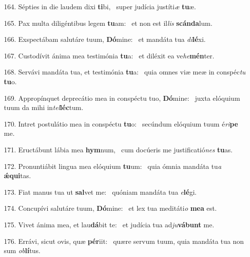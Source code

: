 164. Sépties in die laudem dixi \textbf{ti}bi, \ast\  super judícia justíti\textit{æ} \textbf{tu}æ.\

165. Pax multa diligéntibus legem \textbf{tu}am: \ast\  et non est il\textit{lis} \textbf{scán}\textbf{da}lum.\

166. Exspectábam salutáre tuum, \textbf{Dó}mine: \ast\  et mandáta tua \textit{di}\textbf{lé}xi.\

167. Custodívit ánima mea testimónia \textbf{tu}a: \ast\  et diléxit ea ve\textit{he}\textbf{mén}ter.\

168. Servávi mandáta tua, et testimónia \textbf{tu}a: \ast\  quia omnes viæ meæ in conspéc\textit{tu} \textbf{tu}o.\

169. Appropínquet deprecátio mea in conspéctu tuo, \textbf{Dó}mine: \ast\  juxta elóquium tuum da mihi in\textit{tel}\textbf{léc}tum.\

170. Intret postulátio mea in conspéctu \textbf{tu}o: \ast\  secúndum elóquium tuum é\textit{ri}\textbf{pe} me.\

171. Eructábunt lábia mea \textbf{hym}num, \ast\  cum docúeris me justificatió\textit{nes} \textbf{tu}as.\

172. Pronuntiábit lingua mea elóquium \textbf{tu}um: \ast\  quia ómnia mandáta tu\textit{a} \textbf{ǽ}\textbf{qui}tas.\

173. Fiat manus tua ut \textbf{sal}vet me: \ast\  quóniam mandáta tua \textit{e}\textbf{lé}gi.\

174. Concupívi salutáre tuum, \textbf{Dó}mine: \ast\  et lex tua meditáti\textit{o} \textbf{me}\textbf{a} est.\

175. Vivet ánima mea, et lau\textbf{dá}bit te: \ast\  et judícia tua ad\textit{ju}\textbf{vá}\textbf{bunt} me.\

176. Errávi, sicut ovis, quæ \textbf{pér}iit: \ast\  quære servum tuum, quia mandáta tua non sum \textit{ob}\textbf{lí}tus.\


